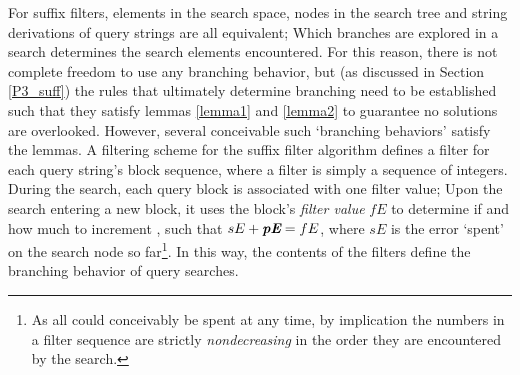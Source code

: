 For \glspl{suffix filter}, elements in the search space, nodes in the search tree and string \glspl{derivation} of \gls{query} strings are all equivalent; Which branches are explored in a search determines the search elements encountered. For this reason, there is not complete freedom to use any branching behavior, but (as discussed in Section \ref{P3_suff}) the rules that ultimately determine branching need to be established such that they satisfy lemmas \ref{lemma1} and \ref{lemma2} to guarantee no solutions are overlooked. However, several conceivable such `branching behaviors' satisfy the lemmas. A \gls{filtering scheme} for the suffix filter algorithm defines a \gls{filter} for each query string's \gls{block sequence}, where a filter is simply a sequence of integers. During the search, each query block is associated with one filter value; Upon the search entering a new block, it uses the block's \textit{filter value} $fE$ to determine if and how much to increment , such that $sE+\textit{\textbf{pE}}=fE$, where $sE$ is the error `spent' on the search node so far\footnote{As all  could conceivably be spent at any time, by implication the numbers in a filter sequence are strictly \textit{nondecreasing} in the order they are encountered by the search.}. In this way, the contents of the filters define the branching behavior of query searches.

